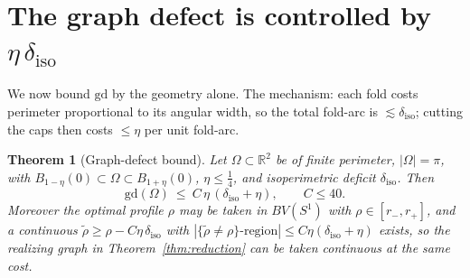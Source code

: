 \documentclass[11pt]{article}
\newtheorem{theorem}{Theorem}
\theoremstyle{definition}
\newcommand{\R}{\mathbb R}
\newcommand{\Om}{\Omega}
\newcommand{\diso}{\delta_{\mathrm{iso}}}
\newcommand{\gd}{\mathrm{gd}}
\newcommand{\abs}[1]{\left|#1\right|}
\begin{document}
\section{The graph defect is controlled by $\eta\,\diso$}
\label{sec:gd}

We now bound $\gd$ by the geometry alone. The mechanism: each fold costs
perimeter proportional to its angular width, so the total fold-arc is
$\lesssim\diso$; cutting the caps then costs $\le\eta$ per unit fold-arc.

\begin{theorem}[Graph-defect bound]\label{thm:gd}
Let $\Om\subset\R^2$ be of finite perimeter, $\abs\Om=\pi$, with
$B_{1-\eta}(0)\subset\Om\subset B_{1+\eta}(0)$, $\eta\le\tfrac14$, and
isoperimetric deficit $\diso$. Then
\begin{equation}\label{eq:gd-bound}
   \gd(\Om)\ \le\ C\,\eta\,(\diso+\eta),\qquad C\le 40 .
\end{equation}
Moreover the optimal profile $\rho$ may be taken in $BV(S^1)$ with
$\rho\in[r_-,r_+]$, and a continuous $\widetilde\rho\ge\rho-C\eta\,\diso$
with $\abs{\{\widetilde\rho\ne\rho\}\text{-region}}\le C\eta(\diso+\eta)$
exists, so the realizing graph in Theorem~\ref{thm:reduction} can be taken
continuous at the same cost.
\end{theorem}
\end{document}
